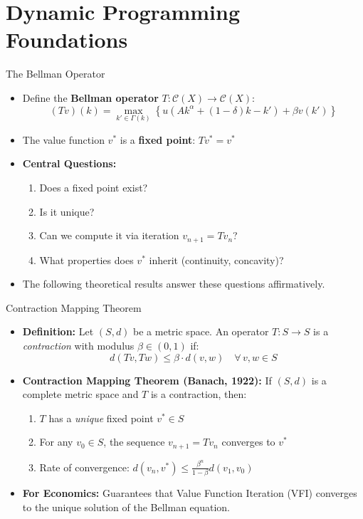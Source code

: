 \section{Dynamic Programming Foundations}

\begin{frame}{The Bellman Operator}
\begin{itemize}
\item Define the \textbf{Bellman operator} $T: \mathcal{C}(X) \to \mathcal{C}(X)$:
\[
(Tv)(k) = \max_{k' \in \Gamma(k)}\left\{ u\left(Ak^{\alpha}+(1-\delta)k - k'\right)+\beta v(k') \right\}
\]

\medskip
\item The value function $v^*$ is a \textbf{fixed point}: $Tv^* = v^*$

\medskip
\item \textbf{Central Questions:}
\begin{enumerate}
    \item Does a fixed point exist?
    \item Is it unique?
    \item Can we compute it via iteration $v_{n+1} = Tv_n$?
    \item What properties does $v^*$ inherit (continuity, concavity)?
\end{enumerate}

\medskip
\item The following theoretical results answer these questions affirmatively.
\end{itemize}
\end{frame}

\begin{frame}{Contraction Mapping Theorem}
\begin{itemize}
\item \textbf{Definition:} Let $(S, d)$ be a metric space. An operator $T: S \to S$ is a \emph{contraction} with modulus $\beta \in (0,1)$ if:
\[
d(Tv, Tw) \leq \beta \cdot d(v, w) \quad \forall\, v, w \in S
\]

\medskip
\item \textbf{Contraction Mapping Theorem (Banach, 1922):} If $(S,d)$ is a complete metric space and $T$ is a contraction, then:
\begin{enumerate}
    \item $T$ has a \emph{unique} fixed point $v^* \in S$
    \item For any $v_0 \in S$, the sequence $v_{n+1} = Tv_n$ converges to $v^*$
    \item Rate of convergence: $d(v_n, v^*) \leq \frac{\beta^n}{1-\beta} d(v_1, v_0)$
\end{enumerate}

\medskip
\item \textbf{For Economics:} Guarantees that Value Function Iteration (VFI) converges to the unique solution of the Bellman equation.
\end{itemize}
\end{frame}

